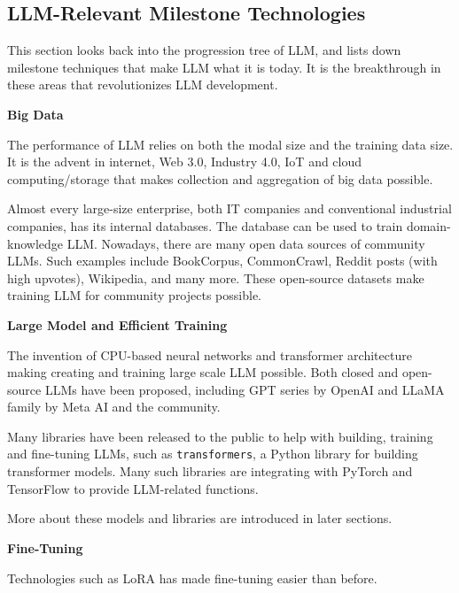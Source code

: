 \subsection{LLM-Relevant Milestone Technologies}

This section looks back into the progression tree of LLM, and lists down milestone techniques that make LLM what it is today. It is the breakthrough in these areas that revolutionizes LLM development.

\vspace{0.1in}
\noindent \textbf{Big Data}
\vspace{0.1in}

The performance of LLM relies on both the modal size and the training data size. It is the advent in internet, Web 3.0, Industry 4.0, IoT and cloud computing/storage that makes collection and aggregation of big data possible.

Almost every large-size enterprise, both IT companies and conventional industrial companies, has its internal databases. The database can be used to train domain-knowledge LLM. Nowadays, there are many open data sources of community LLMs. Such examples include BookCorpus, CommonCrawl, Reddit posts (with high upvotes), Wikipedia, and many more. These open-source datasets make training LLM for community projects possible.

\vspace{0.1in}
\noindent \textbf{Large Model and Efficient Training}
\vspace{0.1in}

The invention of CPU-based neural networks and transformer architecture making creating and training large scale LLM possible. Both closed and open-source LLMs have been proposed, including GPT series by OpenAI and LLaMA family by Meta AI and the community.

Many libraries have been released to the public to help with building, training and fine-tuning LLMs, such as \verb|transformers|, a Python library for building transformer models. Many such libraries are integrating with PyTorch and TensorFlow to provide LLM-related functions.

More about these models and libraries are introduced in later sections.

\vspace{0.1in}
\noindent \textbf{Fine-Tuning}
\vspace{0.1in}

Technologies such as LoRA has made fine-tuning easier than before.

